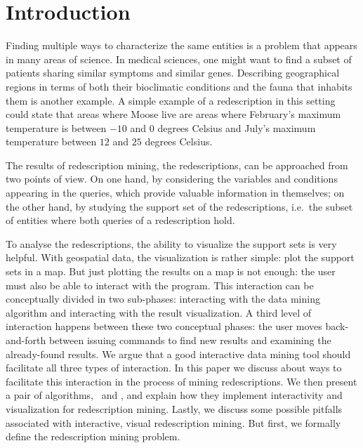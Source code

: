 \section{Introduction}

Finding multiple ways to characterize the same entities is a problem
that appears in many areas of science.  In medical sciences, one might
want to find a subset of patients sharing similar symptoms and similar
genes. Describing geographical regions in terms of both their
bioclimatic conditions and the fauna that inhabits them is another
example.  A simple example of a redescription in this setting could
state that areas where Moose live are areas where February's maximum
temperature is between $-10$ and $0$ degrees Celsius and July's
maximum temperature between $12$ and $25$ degrees Celsius.

The results of redescription mining, the redescriptions, can be
approached from two points of view. On one hand, by considering the
variables and conditions appearing in the queries, which provide
valuable information in themselves; on the other hand, by studying the
support set of the redescriptions, i.e.\ the subset of entities where
both queries of a redescription hold. 
 

To analyse the
redescriptions, the ability to visualize the support sets is very
helpful. With geospatial data, the visualization is rather simple:
plot the support sets in a map. But just plotting the results on a map
is not enough: the user must also be able to interact with the
program. This interaction can be conceptually divided in two
sub-phases: interacting with the data mining algorithm and interacting
with the result visualization. A third level of interaction happens
between these two conceptual phases: the user moves back-and-forth
between issuing commands to find new results and examining the
already-found results. We argue that a good interactive data mining
tool should facilitate all three types of interaction. In this paper
we discuss about ways to facilitate this interaction in the process of
mining redescriptions. We then present a pair of algorithms, \ReReMi\
and \Siren, and explain how they implement interactivity and
visualization for redescription mining. Lastly, we discuss some
possible pitfalls associated with interactive, visual redescription
mining. But first, we formally define the redescription mining
problem.

